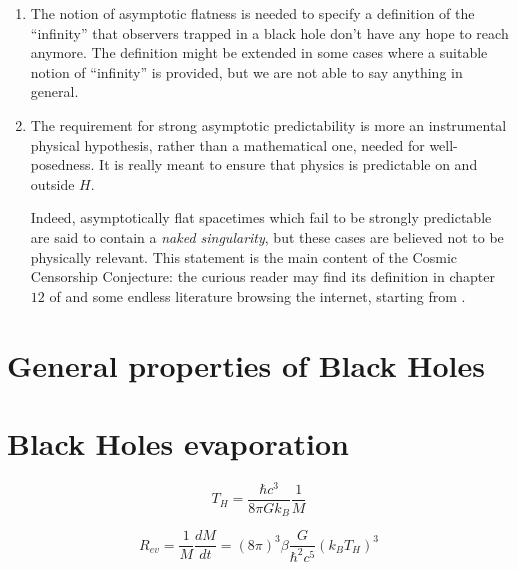 \begin{remark}
	\begin{enumerate}[label=(\Roman*)]
		\item The notion of asymptotic flatness is needed to specify a definition of the ``infinity'' that observers trapped in a black hole don't have any hope to reach anymore. The definition might be extended in some cases where a suitable notion of ``infinity'' is provided, but we are not able to say anything in general.
		\item The requirement for strong asymptotic predictability is more an instrumental physical hypothesis, rather than a mathematical one, needed for well-posedness. It is really meant to ensure that physics is predictable on and outside \(H\).
		
		Indeed, asymptotically flat spacetimes which fail to be strongly predictable are said to contain a \emph{naked singularity}, but these cases are believed not to be physically relevant. This statement is the main content of the Cosmic Censorship Conjecture: the curious reader may find its definition in chapter \(12\) of \cite{wald2010general} and some endless literature browsing the internet, starting from \cite{dias2018strong}.
	\end{enumerate}
\end{remark}


\section{General properties of Black Holes}

\section{Black Holes evaporation}
\label{sec:black-holes-evaporation}

\begin{equation}
	\label{eq:hawking-temperature}
	T_H = \frac{\hbar c^3}{8\pi Gk_B}\frac{1}{M}
\end{equation}

\begin{equation}
	\label{eq:evaporation-rate}
	R_{ev} = \frac{1}{M}\frac{dM}{dt} = (8\pi)^3\beta \frac{G}{\hbar^2c^5}\left(k_BT_H\right)^3
\end{equation}


